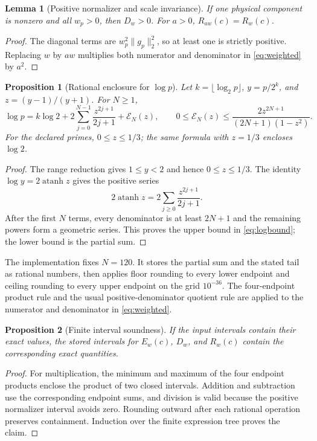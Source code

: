 \documentclass[10pt,a4paper]{article}
\newtheorem{proposition}{Proposition}
\newtheorem{lemma}{Lemma}
\begin{document}
\begin{lemma}[Positive normalizer and scale invariance]
If one physical component is nonzero and all $w_p>0$, then $D_w>0$.  For
$a>0$, $R_{aw}(c)=R_w(c)$.
\end{lemma}
\begin{proof}
The diagonal terms are $w_p^2\|g_p\|_2^2$, so at least one is strictly
positive.  Replacing $w$ by $aw$ multiplies both numerator and denominator
in \eqref{eq:weighted} by $a^2$.
\end{proof}

\begin{proposition}[Rational enclosure for $\log p$]
Let $k=\lfloor\log_2p\rfloor$, $y=p/2^k$, and
$z=(y-1)/(y+1)$.  For $N\geq1$,
\begin{equation}
 \log p=k\log2+2\sum_{j=0}^{N-1}\frac{z^{2j+1}}{2j+1}+\mathcal E_N(z),
 \qquad
 0\leq\mathcal E_N(z)\leq
 \frac{2z^{2N+1}}{(2N+1)(1-z^2)}.
 \label{eq:logbound}
\end{equation}
For the declared primes, $0\leq z\leq1/3$; the same formula with
$z=1/3$ encloses $\log2$.
\end{proposition}
\begin{proof}
The range reduction gives $1\leq y<2$ and hence $0\leq z\leq1/3$.
The identity $\log y=2\operatorname{atanh}z$ gives the positive series
\[
 2\operatorname{atanh}z=2\sum_{j\geq0}\frac{z^{2j+1}}{2j+1}.
\]
After the first $N$ terms, every denominator is at least $2N+1$ and the
remaining powers form a geometric series.  This proves the upper bound in
\eqref{eq:logbound}; the lower bound is the partial sum.
\end{proof}

The implementation fixes $N=120$.  It stores the partial sum and the stated
tail as rational numbers, then applies floor rounding to every lower endpoint
and ceiling rounding to every upper endpoint on the grid $10^{-36}$.  The
four-endpoint product rule and the usual positive-denominator quotient rule
are applied to the numerator and denominator in \eqref{eq:weighted}.

\begin{proposition}[Finite interval soundness]
If the input intervals contain their exact values, the stored intervals for
$E_w(c)$, $D_w$, and $R_w(c)$ contain the corresponding exact quantities.
\end{proposition}
\begin{proof}
For multiplication, the minimum and maximum of the four endpoint products
enclose the product of two closed intervals.  Addition and subtraction use
the corresponding endpoint sums, and division is valid because the positive
normalizer interval avoids zero.  Rounding outward after each rational
operation preserves containment.  Induction over the finite expression tree
proves the claim.
\end{proof}
\end{document}
